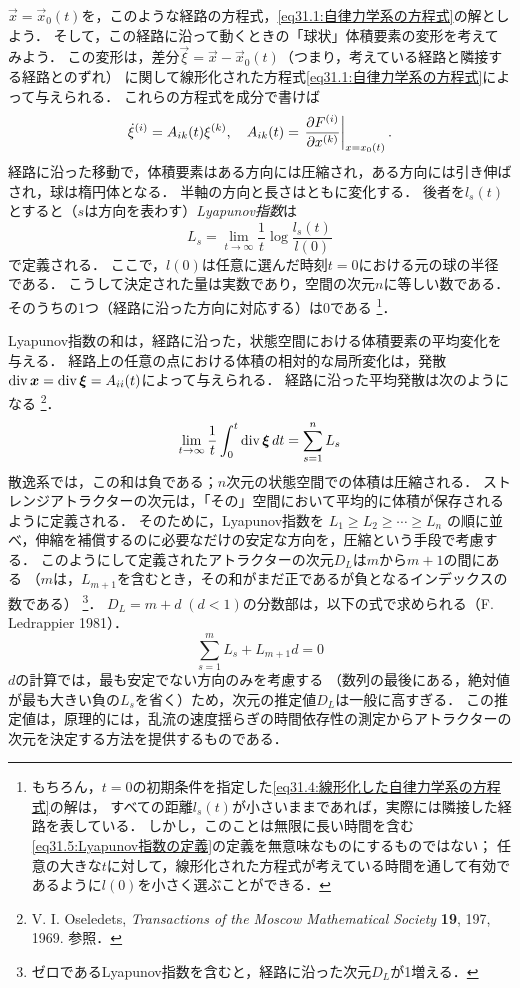 $\vec{x}=\vec{x}_0(t)$を，このような経路の方程式，\eqref{eq31.1:自律力学系の方程式}の解としよう．
そして，この経路に沿って動くときの「球状」体積要素の変形を考えてみよう．
この変形は，差分$\vec{\xi}=\vec{x}-\vec{x}_0(t)$（つまり，考えている経路と隣接する経路とのずれ）
に関して線形化された方程式\eqref{eq31.1:自律力学系の方程式}によって与えられる．
これらの方程式を成分で書けば
\begin{equation}\label{eq31.4:線形化した自律力学系の方程式}
    \dot{\xi}^{(i)} = A_{ik}(t) \xi^{(k)}, \quad
    A_{ik}(t) = \eval{\pdv{F^{(i)}}{x^{(k)}}}_{x=x_0(t)} .
\end{equation}
経路に沿った移動で，体積要素はある方向には圧縮され，ある方向には引き伸ばされ，球は楕円体となる．
半軸の方向と長さはともに変化する．
後者を$l_s(t)$とすると（$s$は方向を表わす）\emph{Lyapunov指数}は
\begin{equation}\label{eq31.5:Lyapunov指数の定義}
    L_s = \lim_{t\to\infty} \frac{1}{t} \log \frac{l_s(t)}{l(0)}
\end{equation}
で定義される．
ここで，$l(0)$は任意に選んだ時刻$t=0$における元の球の半径である．
こうして決定された量は実数であり，空間の次元$n$に等しい数である．
そのうちの1つ（経路に沿った方向に対応する）は0である
\footnote{もちろん，$t=0$の初期条件を指定した\eqref{eq31.4:線形化した自律力学系の方程式}の解は，
すべての距離$l_s(t)$が小さいままであれば，実際には隣接した経路を表している．
しかし，このことは無限に長い時間を含む\eqref{eq31.5:Lyapunov指数の定義}の定義を無意味なものにするものではない；
任意の大きな$t$に対して，線形化された方程式が考えている時間を通して有効であるように$l(0)$を小さく選ぶことができる．}．



Lyapunov指数の和は，経路に沿った，状態空間における体積要素の平均変化を与える．
経路上の任意の点における体積の相対的な局所変化は，発散$\operatorname{div}\vb*{x}=\operatorname{div}\vb*{\xi}=A_{ii}(t)$によって与えられる．
経路に沿った平均発散は次のようになる
\footnote{V. I. Oseledets, \textit{Transactions of the Moscow Mathematical Society} \textbf{19}, 197, 1969.
参照．}．
\begin{equation}
    \lim_{t\to\infty} \frac{1}{t} \int_0^t \operatorname{div}\vb*{\xi} \, dt = \sum_{s=1}^n L_s
\end{equation}
散逸系では，この和は負である；$n$次元の状態空間での体積は圧縮される．
ストレンジアトラクターの次元は，「その」空間において平均的に体積が保存されるように定義される．
そのために，Lyapunov指数を
$L_1 \geq L_2 \geq \cdots \geq L_n$
の順に並べ，伸縮を補償するのに必要なだけの安定な方向を，圧縮という手段で考慮する．
このようにして定義されたアトラクターの次元$D_L$は$m$から$m+1$の間にある
（$m$は，$L_{m+1}$を含むとき，その和がまだ正であるが負となるインデックスの数である）
\footnote{ゼロであるLyapunov指数を含むと，経路に沿った次元$D_L$が1増える．}．
$D_L=m+d \;(d<1)$の分数部は，以下の式で求められる（F. Ledrappier 1981）．
\begin{equation}
    \sum_{s=1}^m L_s + L_{m+1}d = 0
\end{equation}
$d$の計算では，最も安定でない方向のみを考慮する
（数列の最後にある，絶対値が最も大きい負の$L_s$を省く）ため，次元の推定値$D_L$は一般に高すぎる．
この推定値は，原理的には，乱流の速度揺らぎの時間依存性の測定からアトラクターの次元を決定する方法を提供するものである．




\BackToTheToc